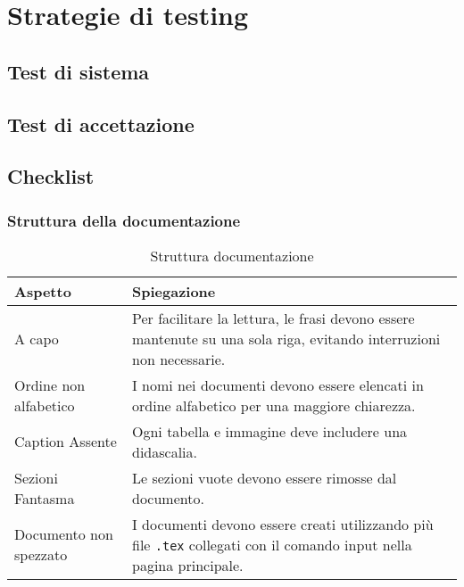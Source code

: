 

\section{Strategie di testing}
\label{sec:strategie di testing}

\subsection{Test di sistema}

\subsection{Test di accettazione}

\subsection{Checklist}

\subsubsection{Struttura della documentazione}
\begin{table}[h!]
    \centering
    \renewcommand{\arraystretch}{1.5} %
    \begin{tabularx}{\textwidth}{|p{}|X|}
    \hline
    \rowcolor[HTML]{FFD700}
    \textbf{Aspetto} & \textbf{Spiegazione} \\ \hline
    A capo & Per facilitare la lettura, le frasi devono essere mantenute su 
    una sola riga, evitando interruzioni non necessarie. \\ \hline
    Ordine non alfabetico & I nomi nei documenti devono essere elencati 
    in ordine alfabetico per una maggiore chiarezza. \\ \hline
    Caption Assente & Ogni tabella e immagine deve includere una didascalia. \\ \hline
    Sezioni Fantasma & Le sezioni vuote devono essere rimosse dal documento. \\ \hline
    Documento non spezzato & I documenti devono essere creati utilizzando più file \texttt{.tex} collegati 
    con il comando input nella pagina principale. \\ \hline
    \end{tabularx}
    \caption{Struttura documentazione}
\end{table}



